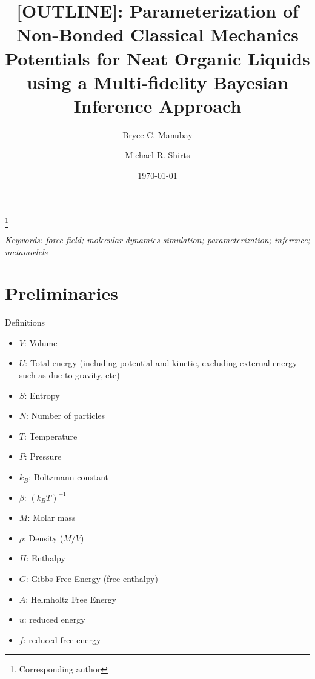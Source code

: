 \documentclass[aps,pre,nofootinbib,superscriptaddress,linenumbers,10pt, draft,tightenlines]{revtex4-1}
\begin{document}


\title{[OUTLINE]: Parameterization of Non-Bonded Classical Mechanics Potentials for Neat Organic Liquids using a Multi-fidelity Bayesian Inference Approach}

\author{Bryce C. Manubay} 

\author{Michael R. Shirts}
\thanks{Corresponding author}

\date{\today}



\emph{Keywords: force field; molecular dynamics simulation; parameterization; inference; metamodels}

\maketitle



\section{Preliminaries}
Definitions
\begin{itemize}
\item $V$: Volume
\item $U$: Total energy (including potential and kinetic, excluding external energy such as due to gravity, etc)
\item $S$: Entropy
\item $N$: Number of particles
\item $T$: Temperature
\item $P$: Pressure
\item $k_B$: Boltzmann constant
\item $\beta$: $(k_B T)^{-1}$
\item $M$: Molar mass
\item $\rho$: Density ($M/V$)
\item $H$: Enthalpy 
\item $G$: Gibbs Free Energy (free enthalpy)
\item $A$: Helmholtz Free Energy
\item $u$: reduced energy
\item $f$: reduced free energy
\end{itemize}
\pagebreak
\end{document}
